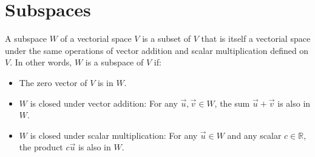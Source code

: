 \section{Subspaces}
\begin{definition}[Subspace]
    A subspace $W$ of a vectorial space $V$ is a subset of $V$ that is itself a vectorial space under the same operations of vector addition and scalar multiplication defined on $V$. In other words, $W$ is a subspace of $V$ if:
    \begin{itemize}[itemsep=1pt,label=$\circ$]
        \item The zero vector of $V$ is in $W$.
        \item $W$ is closed under vector addition: For any $\vec{u}, \vec{v} \in W$, the sum $\vec{u} + \vec{v}$ is also in $W$.
        \item $W$ is closed under scalar multiplication: For any $\vec{u} \in W$ and any scalar $c \in \mathbb{R}$, the product $c\vec{u}$ is also in $W$.
    \end{itemize}
\end{definition}


